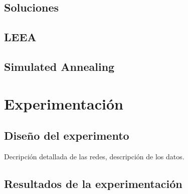 \subsection{Soluciones}
\subsection{LEEA}
\subsection{Simulated Annealing}

\section{Experimentación}
\subsection{Diseño del experimento}
Decripción detallada de las redes, descripción de los datos.

\subsection{Resultados de la experimentación}

